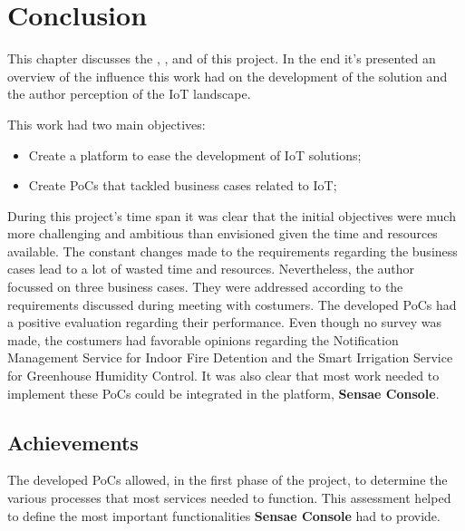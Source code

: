 \chapter{Conclusion}
\label{chap:conclusion}

This chapter discusses the , , and  of this project.
In the end it's presented an overview of the influence this work had on the development of the solution and the author perception of the \gls{IoT} landscape.

This work had two main objectives:

\begin{itemize}
    \item Create a platform to ease the development of \gls{IoT} solutions;
    \item Create \gls{PoC}s that tackled business cases related to \gls{IoT};
\end{itemize}

During this project's time span it was clear that the initial objectives were much more challenging and ambitious than envisioned given the time and resources available. The constant changes made to the requirements regarding the business cases lead to a lot of wasted time and resources. Nevertheless, the author focussed on three business cases. They were addressed according to the requirements discussed during meeting with costumers. The developed \gls{PoC}s had a positive evaluation regarding their performance. Even though no survey was made, the costumers had favorable opinions regarding the Notification Management Service for Indoor Fire Detention and the Smart Irrigation Service for Greenhouse Humidity Control. It was also clear that most work needed to implement these \gls{PoC}s could be integrated in the platform, \textbf{Sensae Console}.

\section{Achievements}
\label{sec:conclusion:achivements}

The developed \gls{PoC}s allowed, in the first phase of the project, to determine the various processes that most services needed to function. This assessment helped to define the most important functionalities \textbf{Sensae Console} had to provide.

